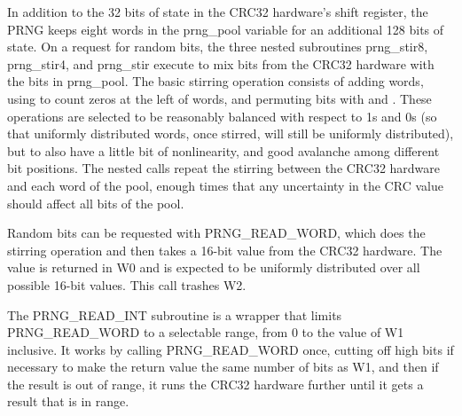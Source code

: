 In addition to the 32 bits of state in the CRC32 hardware's shift register,
the PRNG keeps eight words in the prng\_pool variable for an additional 128
bits of state.  On a request for random bits, the three nested subroutines
prng\_stir8, prng\_stir4, and prng\_stir execute to mix bits from the CRC32
hardware with the bits in prng\_pool.  The basic stirring operation consists
of adding words, using  to count zeros at the left of words, and
permuting bits with  and .  These operations are
selected to be reasonably balanced with respect to 1s and 0s (so that
uniformly distributed words, once stirred, will still be uniformly
distributed), but to also have a little bit of nonlinearity, and good
avalanche among different bit positions.  The nested calls repeat the
stirring between the CRC32 hardware and each word of the pool, enough times
that any uncertainty in the CRC value should affect all bits of the pool.

Random bits can be requested with PRNG\_READ\_WORD, which does the stirring
operation and then takes a 16-bit value from the CRC32 hardware.  The value
is returned in W0 and is expected to be uniformly distributed over all
possible 16-bit values.  This call trashes W2.

The PRNG\_READ\_INT subroutine is a wrapper that limits PRNG\_READ\_WORD to
a selectable range, from 0 to the value of W1 inclusive.  It works by
calling PRNG\_READ\_WORD once, cutting off high bits if necessary to make
the return value the same number of bits as W1, and then if the result is
out of range, it runs the CRC32 hardware further until it gets a result that
is in range.
